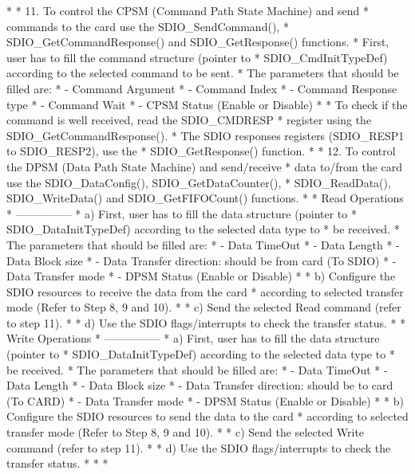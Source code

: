 \begin{DoxyVerb}
*
*          11. To control the CPSM (Command Path State Machine) and send 
*              commands to the card use the SDIO_SendCommand(), 
*              SDIO_GetCommandResponse() and SDIO_GetResponse() functions.     
*              First, user has to fill the command structure (pointer to
*              SDIO_CmdInitTypeDef) according to the selected command to be sent.
*                 The parameters that should be filled are:
*                   - Command Argument
*                   - Command Index
*                   - Command Response type
*                   - Command Wait
*                   - CPSM Status (Enable or Disable)
*
*              To check if the command is well received, read the SDIO_CMDRESP
*              register using the SDIO_GetCommandResponse().
*              The SDIO responses registers (SDIO_RESP1 to SDIO_RESP2), use the
*              SDIO_GetResponse() function.
*
*          12. To control the DPSM (Data Path State Machine) and send/receive 
*              data to/from the card use the SDIO_DataConfig(), SDIO_GetDataCounter(), 
*              SDIO_ReadData(), SDIO_WriteData() and SDIO_GetFIFOCount() functions.
*
*              Read Operations
*              ---------------
*              a) First, user has to fill the data structure (pointer to
*                 SDIO_DataInitTypeDef) according to the selected data type to
*                 be received.
*                 The parameters that should be filled are:
*                   - Data TimeOut
*                   - Data Length
*                   - Data Block size
*                   - Data Transfer direction: should be from card (To SDIO)
*                   - Data Transfer mode
*                   - DPSM Status (Enable or Disable)
*                                   
*              b) Configure the SDIO resources to receive the data from the card
*                 according to selected transfer mode (Refer to Step 8, 9 and 10).
*
*              c) Send the selected Read command (refer to step 11).
*                  
*              d) Use the SDIO flags/interrupts to check the transfer status.
*
*              Write Operations
*              ---------------
*              a) First, user has to fill the data structure (pointer to
*                 SDIO_DataInitTypeDef) according to the selected data type to
*                 be received.
*                 The parameters that should be filled are:
*                   - Data TimeOut
*                   - Data Length
*                   - Data Block size
*                   - Data Transfer direction:  should be to card (To CARD)
*                   - Data Transfer mode
*                   - DPSM Status (Enable or Disable)
*
*              b) Configure the SDIO resources to send the data to the card
*                 according to selected transfer mode (Refer to Step 8, 9 and 10).
*                   
*              c) Send the selected Write command (refer to step 11).
*                  
*              d) Use the SDIO flags/interrupts to check the transfer status.
*
*
*  \end{DoxyVerb}


